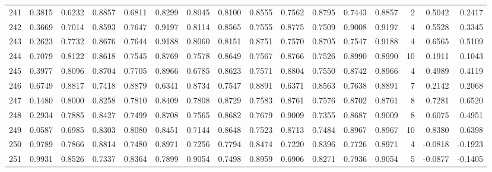 \begin{tabular}{lrrrrrrrrrrrrrrr}
241 &      0.3815 &  0.6232 &  0.8857 &  0.6811 &  0.8299 &  0.8045 &  0.8100 &  0.8555 &  0.7562 &  0.8795 &   0.7443 &     0.8857 &      2 &                    0.5042 &                     0.2417 \\
242 &      0.3669 &  0.7014 &  0.8593 &  0.7647 &  0.9197 &  0.8114 &  0.8565 &  0.7555 &  0.8775 &  0.7509 &   0.9008 &     0.9197 &      4 &                    0.5528 &                     0.3345 \\
243 &      0.2623 &  0.7732 &  0.8676 &  0.7644 &  0.9188 &  0.8060 &  0.8151 &  0.8751 &  0.7570 &  0.8705 &   0.7547 &     0.9188 &      4 &                    0.6565 &                     0.5109 \\
244 &      0.7079 &  0.8122 &  0.8618 &  0.7545 &  0.8769 &  0.7578 &  0.8649 &  0.7567 &  0.8766 &  0.7526 &   0.8990 &     0.8990 &     10 &                    0.1911 &                     0.1043 \\
245 &      0.3977 &  0.8096 &  0.8704 &  0.7705 &  0.8966 &  0.6785 &  0.8623 &  0.7571 &  0.8804 &  0.7550 &   0.8742 &     0.8966 &      4 &                    0.4989 &                     0.4119 \\
246 &      0.6749 &  0.8817 &  0.7418 &  0.8879 &  0.6341 &  0.8734 &  0.7547 &  0.8891 &  0.6371 &  0.8563 &   0.7638 &     0.8891 &      7 &                    0.2142 &                     0.2068 \\
247 &      0.1480 &  0.8000 &  0.8258 &  0.7810 &  0.8409 &  0.7808 &  0.8729 &  0.7583 &  0.8761 &  0.7576 &   0.8702 &     0.8761 &      8 &                    0.7281 &                     0.6520 \\
248 &      0.2934 &  0.7885 &  0.8427 &  0.7499 &  0.8708 &  0.7565 &  0.8682 &  0.7679 &  0.9009 &  0.7355 &   0.8687 &     0.9009 &      8 &                    0.6075 &                     0.4951 \\
249 &      0.0587 &  0.6985 &  0.8303 &  0.8080 &  0.8451 &  0.7144 &  0.8648 &  0.7523 &  0.8713 &  0.7484 &   0.8967 &     0.8967 &     10 &                    0.8380 &                     0.6398 \\
250 &      0.9789 &  0.7866 &  0.8814 &  0.7480 &  0.8971 &  0.7256 &  0.7794 &  0.8474 &  0.7220 &  0.8396 &   0.7726 &     0.8971 &      4 &                   -0.0818 &                    -0.1923 \\
251 &      0.9931 &  0.8526 &  0.7337 &  0.8364 &  0.7899 &  0.9054 &  0.7498 &  0.8959 &  0.6906 &  0.8271 &   0.7936 &     0.9054 &      5 &                   -0.0877 &                    -0.1405 \\

\end{tabular}
